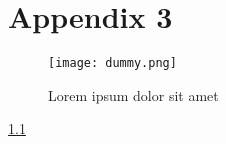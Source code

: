 \chapter{Appendix 3}
\label{appendix:appendix3}

\begin{figure}[H]
    \centering
    \texttt{[image: dummy.png]}
    \caption{Lorem ipsum dolor sit amet}
    \label{fig:figAppendix-3}
\end{figure}

\lipsum[1-1] \ref{fig:figAppendix-3}